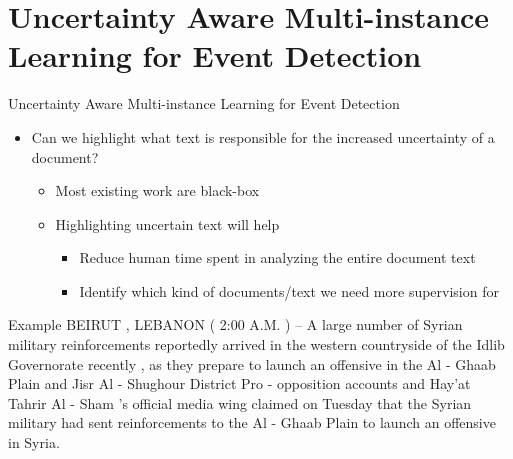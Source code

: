 \section{Uncertainty Aware Multi-instance Learning for Event Detection}
\begin{frame}{Uncertainty Aware Multi-instance Learning for Event Detection}
\begin{itemize}
    \item Can we highlight what text is responsible for the increased uncertainty of a document?
    \begin{itemize}
        \item Most existing work are black-box
        \item Highlighting uncertain text will help
            \begin{itemize}
                \item Reduce human time spent in analyzing the entire document text
                \item Identify which kind of documents/text we need more supervision for
            \end{itemize}
    \end{itemize}
\end{itemize}
\begin{small}
\begin{block}{Example}
BEIRUT , LEBANON ( 2:00 A.M. ) – A large number of Syrian military reinforcements reportedly arrived in the western countryside of the Idlib Governorate recently , as they prepare to launch an offensive in the Al - Ghaab Plain and Jisr Al - Shughour District
Pro - opposition accounts and Hay’at Tahrir Al - Sham ’s official media wing \alert{claimed on Tuesday that the Syrian military had sent reinforcements} to the Al - Ghaab Plain to launch an offensive in Syria.
\end{block}
\end{small}
\end{frame}


